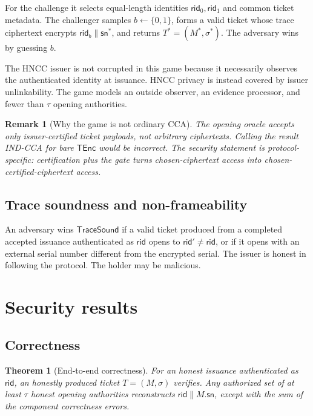\documentclass[11pt]{article}
\newtheorem{theorem}[definition]{Theorem}
\newtheorem{remark}[definition]{Remark}
\newcommand{\TEnc}{\mathsf{TEnc}}
\newcommand{\rid}{\mathsf{rid}}
\newcommand{\sn}{\mathsf{sn}}
\begin{document}
For the challenge it selects equal-length identities $\rid_0,\rid_1$ and common
ticket metadata.  The challenger samples $b\leftarrow\{0,1\}$, forms a valid
ticket whose trace ciphertext encrypts $\rid_b\|\sn^*$, and returns
$T^*=(M^*,\sigma^*)$.  The adversary wins by guessing $b$.

The HNCC issuer is not corrupted in this game because it necessarily observes
the authenticated identity at issuance.  HNCC privacy is instead covered by
issuer unlinkability.  The game models an outside observer, an evidence
processor, and fewer than $\tau$ opening authorities.

\begin{remark}[Why the game is not ordinary CCA]
The opening oracle accepts only issuer-certified ticket payloads, not arbitrary
ciphertexts.  Calling the result IND-CCA for bare $\TEnc$ would be incorrect.
The security statement is protocol-specific: certification plus the gate turns
chosen-ciphertext access into chosen-\emph{certified}-ciphertext access.
\end{remark}

\subsection{Trace soundness and non-frameability}

An adversary wins $\mathsf{TraceSound}$ if a valid ticket produced from a
completed accepted issuance authenticated as $\rid$ opens to
$\rid'\neq\rid$, or if it opens with an external serial number different from
the encrypted serial.  The issuer is honest in following the protocol.  The
holder may be malicious.

\section{Security results}

\subsection{Correctness}

\begin{theorem}[End-to-end correctness]\label{thm:correct}
For an honest issuance authenticated as $\rid$, an honestly produced ticket
$T=(M,\sigma)$ verifies.  Any authorized set of at least $\tau$ honest opening
authorities reconstructs $\rid\|M.\sn$, except with the sum of the component
correctness errors.
\end{theorem}
\end{document}
